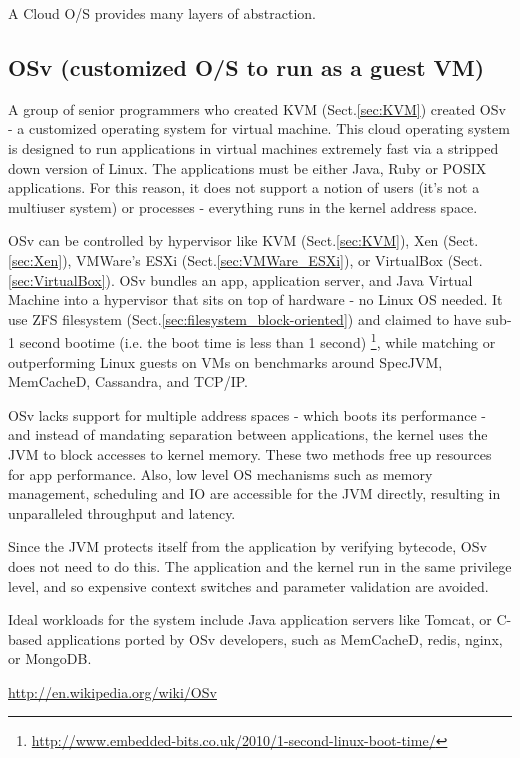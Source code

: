 A Cloud O/S provides many layers of abstraction.


\subsection{OSv (customized O/S to run as a guest VM)}
\label{sec:OSv}

A group of senior programmers who created KVM (Sect.\ref{sec:KVM}) created OSv -
a customized operating system for virtual machine. This cloud operating system
is designed to run applications in virtual machines extremely fast via a
stripped down version of Linux. The applications must be either Java, Ruby or
POSIX applications. For this reason, it does not support a notion of users (it's not a
multiuser system) or processes - everything runs in the kernel address space.

OSv can be controlled by hypervisor like KVM (Sect.\ref{sec:KVM}), Xen
(Sect.\ref{sec:Xen}), VMWare's ESXi (Sect.\ref{sec:VMWare_ESXi}), or VirtualBox
(Sect.\ref{sec:VirtualBox}). OSv bundles an app, application server, and Java
Virtual Machine into a hypervisor that sits on top of hardware - no Linux OS
needed. It use ZFS filesystem (Sect.\ref{sec:filesystem_block-oriented}) and
claimed to have sub-1 second bootime (i.e. the boot time is less than 1 second)
\footnote{\url{http://www.embedded-bits.co.uk/2010/1-second-linux-boot-time/}},
while matching or outperforming Linux guests on VMs on benchmarks around
SpecJVM, MemCacheD, Cassandra, and TCP/IP.

OSv lacks support for multiple address spaces - which boots its performance -
and instead of mandating separation between applications, the kernel uses the
JVM to block accesses to kernel memory. These two methods free up resources for app performance. 
Also, low level OS mechanisms such as memory management, scheduling and IO are
accessible for the JVM directly, resulting in unparalleled throughput and
latency.

Since the JVM protects itself from the application by verifying bytecode, OSv
does not need to do this. The application and the kernel run in the same
privilege level, and so expensive context switches and parameter validation are
avoided.

Ideal workloads for the system include Java application servers like Tomcat, or
C-based applications ported by OSv developers, such as MemCacheD, redis,
nginx, or MongoDB. 

\url{http://en.wikipedia.org/wiki/OSv}

